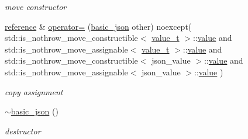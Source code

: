 \begin{DoxyCompactItemize}
\begin{DoxyCompactList}\small\item\em move constructor \end{DoxyCompactList}\item 
\hyperlink{a00025_a3ec8e17be8732fe436e9d6733f52b7a3}{reference} \& \hyperlink{a00025_a7c3182cfabc0bdd9f3a14216fe0e8154}{operator=} (\hyperlink{a00025}{basic\+\_\+json} other) noexcept(                       std\+::is\+\_\+nothrow\+\_\+move\+\_\+constructible$<$ \hyperlink{a00025_a231b02148577b69a154b2ce2c87a5522}{value\+\_\+t} $>$\+::\hyperlink{a00025_a0a2cbbd95862a623e7dc5c37e67dead0}{value} and                       std\+::is\+\_\+nothrow\+\_\+move\+\_\+assignable$<$ \hyperlink{a00025_a231b02148577b69a154b2ce2c87a5522}{value\+\_\+t} $>$\+::\hyperlink{a00025_a0a2cbbd95862a623e7dc5c37e67dead0}{value} and                       std\+::is\+\_\+nothrow\+\_\+move\+\_\+constructible$<$ json\+\_\+value $>$\+::\hyperlink{a00025_a0a2cbbd95862a623e7dc5c37e67dead0}{value} and                       std\+::is\+\_\+nothrow\+\_\+move\+\_\+assignable$<$ json\+\_\+value $>$\+::\hyperlink{a00025_a0a2cbbd95862a623e7dc5c37e67dead0}{value}       )
\begin{DoxyCompactList}\small\item\em copy assignment \end{DoxyCompactList}\item 
\hyperlink{a00025_a947b5b2a832e490858dbdddfe7085831}{$\sim$basic\+\_\+json} ()
\begin{DoxyCompactList}\small\item\em destructor \end{DoxyCompactList}\end{DoxyCompactItemize}
